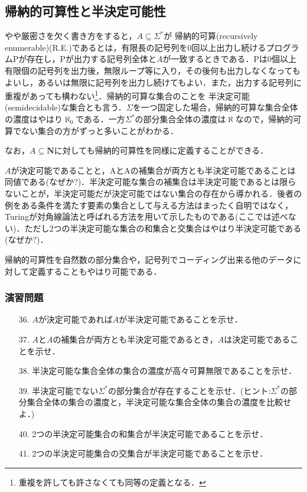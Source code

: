 \documentclass{ltjsarticle}
\theoremstyle{mystyle1}
\theoremstyle{mystyle2}
\newcommand{\bN}{\ensuremath{\mathbf{N}}}
\newcommand{\red}[1]{{\color{red} #1}}
\begin{document}
\subsection{帰納的可算性と半決定可能性}
やや厳密さを欠く書き方をすると，$A\subseteq\Sigma^\ast$が\red{帰納的可算}(recursively enumerable)(R.E.)であるとは，有限長の記号列を0回以上出力し続けるプログラムPが存在し，Pが出力する記号列全体と$A$が一致するときである．Pは0個以上有限個の記号列を出力後，無限ループ等に入り，その後何も出力しなくなってもよいし，あるいは無限に記号列を出力し続けてもよい．また，出力する記号列に重複があっても構わない\footnote{重複を許しても許さなくても同等の定義となる．}．帰納的可算な集合のことを\red{半決定可能}(semidecidable)な集合とも言う．$\Sigma$を一つ固定した場合，帰納的可算な集合全体の濃度はやはり$\aleph_0$である．一方$\Sigma^\ast$の部分集合全体の濃度は$\aleph$なので，帰納的可算でない集合の方がずっと多いことがわかる．

なお，$A\subseteq\bN$に対しても帰納的可算性を同様に定義することができる．

$A$が決定可能であることと，AとAの補集合が両方とも半決定可能であることは同値である(なぜか?)．半決定可能な集合の補集合は半決定可能であるとは限らないことが，半決定可能だが決定可能ではない集合の存在から導かれる．後者の例をある条件を満たす要素の集合として与える方法はまったく自明ではなく，Turingが対角線論法と呼ばれる方法を用いて示したものである(ここでは述べない)．ただし2つの半決定可能な集合の和集合と交集合はやはり半決定可能である(なぜか?)．

帰納的可算性を自然数の部分集合や，記号列でコーディング出来る他のデータに対して定義することもやはり可能である．
\subsubsection*{演習問題}
\begin{enumerate}
  \item[36.] $A$が決定可能であれば$A$が半決定可能であることを示せ．
  \item[37.] $A$と$A$の補集合が両方とも半決定可能であるとき，$A$は決定可能であることを示せ．
  \item[38.] 半決定可能な集合全体の集合の濃度が高々可算無限であることを示せ．
  \item[39.] 半決定可能でない$\Sigma^\ast$の部分集合が存在することを示せ．(ヒント:$\Sigma^\ast$の部分集合全体の集合の濃度と，半決定可能な集合全体の集合の濃度を比較せよ．)
  \item[40.] 2つの半決定可能集合の和集合が半決定可能であることを示せ．
  \item[41.] 2つの半決定可能集合の交集合が半決定可能であることを示せ．
\end{enumerate}
\end{document}
